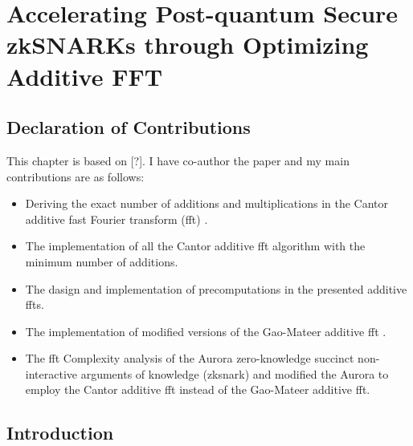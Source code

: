 \chapter{Accelerating Post-quantum Secure zkSNARKs through Optimizing Additive FFT}\label{ch:additive-fft}

\section*{Declaration of Contributions}
This chapter is based on [?]. I have co-author the paper and my main contributions are as follows:
\begin{itemize}
	\item Deriving the exact number of additions and multiplications in the Cantor additive fast Fourier transform (\gls{fft}) \cite{Cantor1989FFT}. 
	\item The \CC implementation of all the Cantor additive \gls{fft} algorithm with the minimum number of additions.
	\item The dasign and implementation of precomputations in the presented additive \gls{fft}s.
	\item The \CC implementation of modified versions of the Gao-Mateer additive \gls{fft} \cite{Gao2010FFT}.
	\item  The \gls{fft} Complexity analysis of the Aurora zero-knowledge succinct non-interactive arguments of knowledge (\gls{zksnark}) and modified the Aurora  \CC  to employ  the Cantor additive \gls{fft} instead of  the Gao-Mateer additive \gls{fft}.
\end{itemize}

\section{Introduction}

